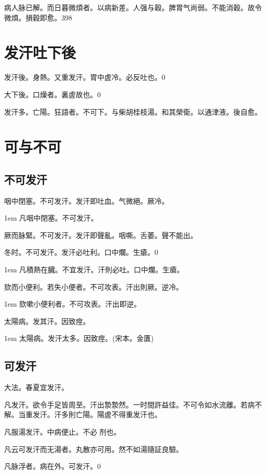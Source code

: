 病人脉已解。而日暮微煩者。以病新差。人强与穀。脾胃气尚弱。不能消穀。故令微煩。損穀即愈。398

\chapter{发汗吐下後}

发汗後。身熱。又重发汗。胃中虗冷。必反吐也。0

大下後。口燥者。裏虗故也。0

发汗多。亡陽。狂語者。不可下。与柴胡桂枝湯。和其榮衛。以通津液。後自愈。

\chapter{可与不可}

\section{不可发汗}

咽中閉塞。不可发汗。发汗即吐血。气微絕。厥冷。

\hangindent 1em
凡咽中閉塞。不可发汗。{\gaoben}

厥{\khaaitp 而脉緊}。不可发汗。发汗即聲亂。咽嘶。舌萎。聲不能出。

冬时。不可发汗。发汗必吐利。口中爛。生瘡。0

\hangindent 1em
凡積熱在臓。不宜发汗。汗則必吐。口中爛。生瘡。{\gaoben}

欬而小便利。若失小便者。不可攻表。汗出則厥。逆冷。

\hangindent 1em
欬嗽小便利者。不可攻表。汗出即逆。{\gaoben}

太陽病。发其汗。因致痙。

\hangindent 1em
太陽病。发汗太多。因致痙。(宋本。金匱)

\section{可发汗}

大法。春夏宜发汗。

凡发汗。欲令手足皆周至。汗出漐漐然。一时間許益佳。不可令如水流離。若病不解。当重发汗。汗多則亡陽。陽虗不得重发汗也。

凡服湯发汗。中病便止。不必{\sungtpii 𥁞}剂也。

凡云可发汗而无湯者。丸散亦可用。然不如湯隨証良驗。

凡脉浮者。病在外。可发汗。0

